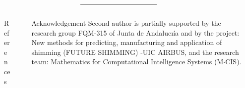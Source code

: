 \documentclass[final]{beamer}
\newlength{\sepmargin}
\newlength{\sepwid}
\newlength{\onecolwid}
\begin{document}
\begin{frame}[t]
\begin{columns}[t]
\begin{column}{\onecolwid}
    \end{column}

    \begin{column}{\sepmargin} \end{column}
  \end{columns}



  \vspace*{0.5cm}
  \begin{columns}[t]
    \begin{column}{\sepmargin}\end{column}
    \begin{column}{0.97\linewidth}
      {\color{blueMUW}\rule{1.012\textwidth}{10pt}}
    \end{column}
    \begin{column}{\sepmargin}\end{column}
  \end{columns}

  \vspace*{-1cm}
  \begin{columns}[t] %

    \begin{column}{\sepmargin} \end{column}
    \begin{column}{\onecolwid}
      \begin{block}{\large References}
        \vspace*{-0.5cm}
        \nocite{*} %
        {\footnotesize
          }
      \end{block}
    \end{column} %
    \begin{column}{\sepwid}  \end{column}

    \begin{column}{\onecolwid}
      \begin{block}{\large Acknowledgement}
        \vspace*{-0.5cm}
        \footnotesize Second author is partially supported by the research group FQM-315 of Junta de Andalucı\'ia and by the project: New methods for predicting, manufacturing and application of shimming (FUTURE SHIMMING) -UIC AIRBUS, and the research team: Mathematics for Computational Intelligence Systems (M$\cdot$CIS).
      \end{block}
      \vspace*{-0.5cm}


\end{column}
\end{columns}
\end{frame}
\end{document}
